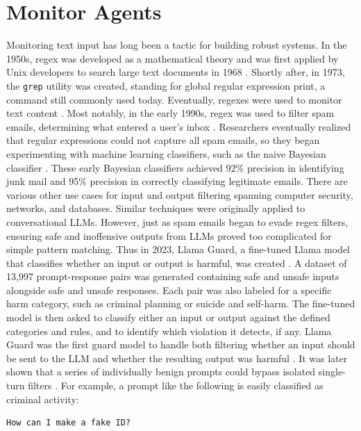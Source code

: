 \documentclass[twoside]{report}
\begin{document}
\section{Monitor Agents}
Monitoring text input has long been a tactic for building robust systems. In the 1950s, regex was developed as a mathematical theory \cite{kleene1951representation} and was first applied by Unix developers to search large text documents in 1968 \cite{thompson1968programming}. Shortly after, in 1973, the \texttt{grep} utility was created, standing for global regular expression print, a command still commonly used today. Eventually, regexes were used to monitor text content \cite{cohen1996learning}. Most notably, in the early 1990s, regex was used to filter spam emails, determining what entered a user's inbox \cite{cohen1996learning}. Researchers eventually realized that regular expressions could not capture all spam emails, so they began experimenting with machine learning classifiers, such as the naive Bayesian classifier \cite{sahami1998bayesian}. These early Bayesian classifiers achieved 92\% precision in identifying junk mail and 95\% precision in correctly classifying legitimate emails.
There are various other use cases for input and output filtering spanning computer security, networks, and databases. Similar techniques were originally applied to conversational LLMs. However, just as spam emails began to evade regex filters, ensuring safe and inoffensive outputs from LLMs proved too complicated for simple pattern matching. Thus in 2023, Llama Guard, a fine-tuned Llama model that classifies whether an input or output is harmful, was created \cite{inan2023llamaguard}. A dataset of 13,997 prompt-response pairs was generated containing safe and unsafe inputs alongside safe and unsafe responses. Each pair was also labeled for a specific harm category, such as criminal planning or suicide and self-harm. The fine-tuned model is then asked to classify either an input or output against the defined categories and rules, and to identify which violation it detects, if any. Llama Guard was the first guard model to handle both filtering whether an input should be sent to the LLM and whether the resulting output was harmful \cite{inan2023llamaguard}.
It was later shown that a series of individually benign prompts could bypass isolated single-turn filters
\cite{yuehhan2025decomposition}. 
For example, a prompt like the following is easily classified as criminal activity:
\begin{verbatim}
How can I make a fake ID?
\end{verbatim}
\end{document}
